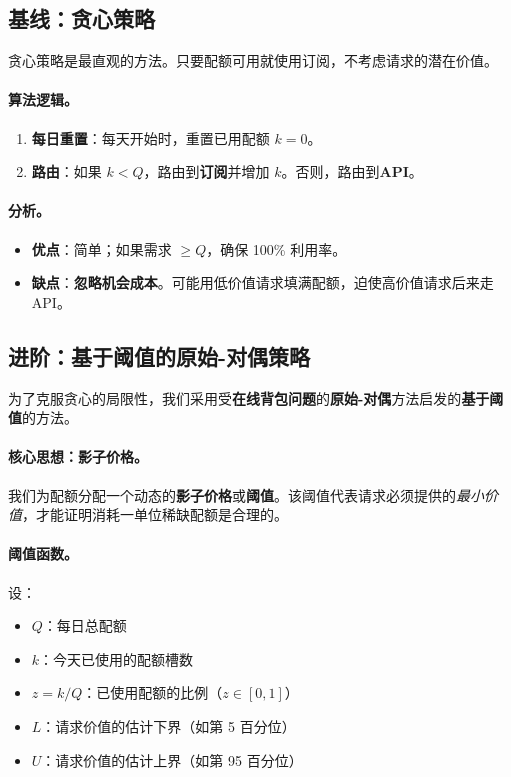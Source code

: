 \documentclass[11pt]{article}
\begin{document}
\subsection{基线：贪心策略}

贪心策略是最直观的方法。只要配额可用就使用订阅，不考虑请求的潜在价值。

\paragraph{算法逻辑。}
\begin{enumerate}
  \item \textbf{每日重置}：每天开始时，重置已用配额 $k = 0$。
  \item \textbf{路由}：如果 $k < Q$，路由到\textbf{订阅}并增加 $k$。否则，路由到\textbf{API}。
\end{enumerate}

\paragraph{分析。}
\begin{itemize}
  \item \textbf{优点}：简单；如果需求 $\ge Q$，确保 100\% 利用率。
  \item \textbf{缺点}：\textbf{忽略机会成本}。可能用低价值请求填满配额，迫使高价值请求后来走 API。
\end{itemize}

\subsection{进阶：基于阈值的原始-对偶策略}

为了克服贪心的局限性，我们采用受\textbf{在线背包问题}的\textbf{原始-对偶}方法启发的\textbf{基于阈值}的方法。

\paragraph{核心思想：影子价格。}
我们为配额分配一个动态的\textbf{影子价格}或\textbf{阈值}。该阈值代表请求必须提供的\emph{最小价值}，才能证明消耗一单位稀缺配额是合理的。

\paragraph{阈值函数。}
设：
\begin{itemize}
  \item $Q$：每日总配额
  \item $k$：今天已使用的配额槽数
  \item $z = k/Q$：已使用配额的比例（$z \in [0, 1]$）
  \item $L$：请求价值的估计下界（如第 5 百分位）
  \item $U$：请求价值的估计上界（如第 95 百分位）
\end{itemize}
\end{document}
